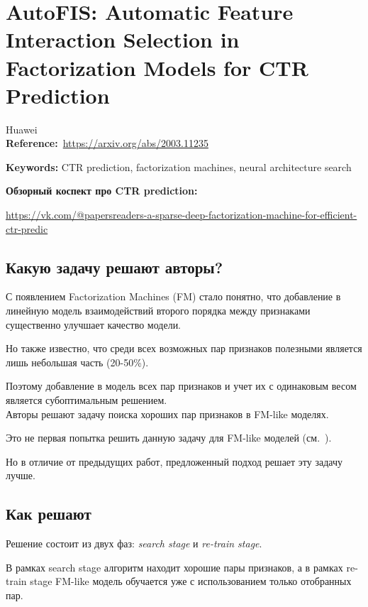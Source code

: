 \chapter{AutoFIS: Automatic Feature Interaction Selection in Factorization Models for CTR Prediction}

Huawei \\

\textbf{Reference:}~\url{https://arxiv.org/abs/2003.11235}

\textbf{Keywords:} CTR prediction, factorization machines, neural architecture search

\textbf{Обзорный коспект про CTR prediction:}

\url{https://vk.com/@papersreaders-a-sparse-deep-factorization-machine-for-efficient-ctr-predic} \\

\section*{Какую задачу решают авторы?}

С появлением Factorization Machines (FM) стало понятно, что добавление в линейную модель взаимодействий второго порядка между признаками существенно улучшает качество модели. 

Но также известно, что среди всех возможных пар признаков полезными является лишь небольшая часть (20-50\%).

Поэтому добавление в модель всех пар признаков и учет их с одинаковым весом является субоптимальным решением. \\

Авторы решают задачу поиска хороших пар признаков в FM-like моделях. 

Это не первая попытка решить данную задачу для FM-like моделей (см.~\cite{xiao2017attentional,pan2018field}).

Но в отличие от предыдущих работ, предложенный подход решает эту задачу лучше.

\section*{Как решают}

Решение состоит из двух фаз: \textit{search stage} и \textit{re-train stage}.

В рамках search stage алгоритм находит хорошие пары признаков, а в рамках re-train stage FM-like модель обучается уже с использованием только отобранных пар.

